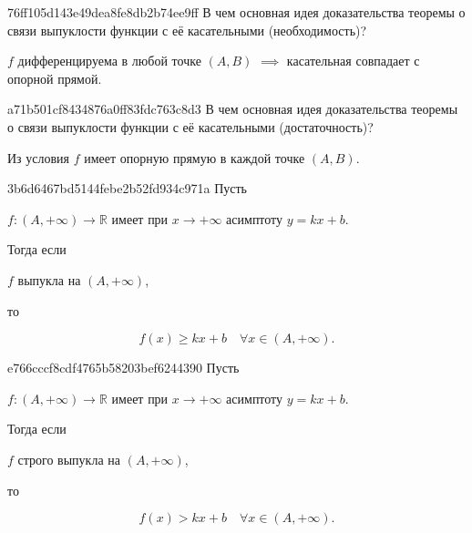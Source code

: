 \begin{note}{76ff105d143e49dea8fe8db2b74ee9ff}
    В чем основная идея доказательства теоремы о связи выпуклости функции с её касательными (необходимость)?

    \begin{cloze}{1}
        \( f \) дифференцируема в любой точке \( (A, B) \) \( \implies \) касательная совпадает с опорной прямой.
    \end{cloze}
\end{note}

\begin{note}{a71b501cf8434876a0ff83fdc763c8d3}
    В чем основная идея доказательства теоремы о связи выпуклости функции с её касательными (достаточность)?

    \begin{cloze}{1}
        Из условия \({ f }\) имеет опорную прямую в каждой точке \({ (A, B) }\).
    \end{cloze}
\end{note}

\begin{note}{3b6d6467bd5144febe2b52fd934c971a}
    Пусть \begin{icloze}{3}\( f : (A, +\infty) \to \mathbb R \) имеет при \( x \to +\infty \) асимптоту \( y = kx + b \).\end{icloze}
    Тогда если \begin{icloze}{2}\( f \) выпукла на \( (A, +\infty) \),\end{icloze} то
    \begin{icloze}{1}
        \[
            f(x) \geqslant kx + b \quad \forall x \in (A, +\infty).
        \]
    \end{icloze}
\end{note}

\begin{note}{e766cccf8cdf4765b58203bef6244390}
    Пусть \begin{icloze}{3}\( f : (A, +\infty) \to \mathbb R \) имеет при \( x \to +\infty \) асимптоту \( y = kx + b \).\end{icloze}
    Тогда если \begin{icloze}{2}\( f \) строго выпукла на \( (A, +\infty) \),\end{icloze} то
    \begin{icloze}{1}
        \[
            f(x) > kx + b \quad \forall x \in (A, +\infty).
        \]
    \end{icloze}
\end{note}

